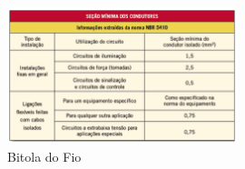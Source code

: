 \begin{figure}[H]
	\centering
	\includegraphics[width=0.6\textwidth]{figuras/BitoladoFio}
	\caption{Bitola do Fio}
	\label{img:BitoladoFio}
\end{figure}

